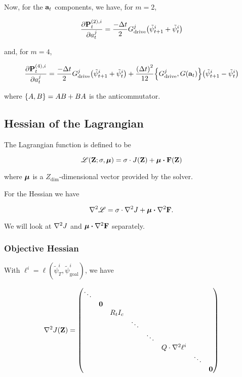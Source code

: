 \documentclass{article}
\newcommand{\isopsi}{\tilde \psi}
\begin{document}
Now, for the $\vb{a}_t$ components, we have, for $m = 2$,

\begin{equation}
  \pdv{\vb{P}_t^{(2),i}}{a^j_t} 
    = \frac{-\Delta t}{2} G^j_{\text{drive}} \qty(\isopsi^i_{t+1} + \isopsi^i_{t})
\end{equation}

and, for $m = 4$,

\begin{equation}
  \pdv{\vb{P}_t^{(4),i}}{a^j_t} 
    = \frac{-\Delta t}{2} G^j_{\text{drive}} \qty(\isopsi^i_{t+1} + \isopsi^i_{t}) + \frac{\qty(\Delta t)^2}{12} \qty{G^j_{\text{drive}}, G(\vb{a}_t)}\qty(\isopsi^i_{t+1} - \isopsi^i_{t})
\end{equation}

where $\qty{A, B} = AB + BA$ is the anticommutator. 


\newpage

\subsection{Hessian of the Lagrangian}

The Lagrangian function is defined to be

\begin{equation}
  \mathscr{L}(\vb{Z}; \sigma, \vb*{\mu}) = \sigma \cdot J(\vb{Z}) + \vb*{\mu} \vdot \vb{F}(\vb{Z})
\end{equation}

where $\vb*{\mu}$ is a $Z_{\dim}$-dimensional vector provided by the solver.

\hfill

For the Hessian we have 

\begin{equation}
  \laplacian \mathscr{L} = \sigma \cdot \laplacian J + \vb*{\mu} \vdot \laplacian \vb{F}.
\end{equation}

We will look at $\laplacian J$ and $\vb*{\mu} \vdot \laplacian \vb{F}$ separately.

\subsubsection*{Objective Hessian}

With $\ell^i = \ell(\isopsi^i_T, \isopsi^i_{\text{goal}})$, we have

\begin{equation}
  \laplacian J(\vb{Z}) = \mqty(
    \ddots \\
    & \vb{0} \\
    & & R_t I_c \\
    & & & \ddots \\
    & & & & \ddots \\
    & & & & & Q \cdot \laplacian \ell^i \\
    & & & & & & \ddots \\
    & & & & & & & \vb{0}
  ) 
\end{equation}
\end{document}
